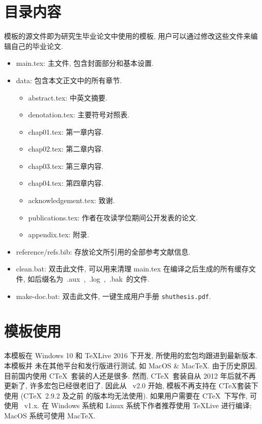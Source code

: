 \section{目录内容}
模板的源文件即为研究生毕业论文中使用的模板, 用户可以通过修改这些文件来编辑自己的毕业论文.
\begin{itemize}
    \item{main.tex}: 主文件, 包含封面部分和基本设置.
    \item{data}: 包含本文正文中的所有章节.
          \begin{itemize}
              \item{abstract.tex}: 中英文摘要.
              \item{denotation.tex}: 主要符号对照表.
              \item{chap01.tex}: 第一章内容.
              \item{chap02.tex}: 第二章内容.
              \item{chap03.tex}: 第三章内容.
              \item{chap04.tex}: 第四章内容.
              \item{acknowledgement.tex}: 致谢.
              \item{publications.tex}: 作者在攻读学位期间公开发表的论文.
              \item{appendix.tex}: 附录.
          \end{itemize}
    \item{reference/refs.bib}: 存放论文所引用的全部参考文献信息.
    \item{clean.bat}: 双击此文件, 可以用来清理 main.tex 在编译之后生成的所有缓存文件,
          如后缀名为~.aux~,~.log~,~.bak~的文件.
    \item{make-doc.bat}: 双击此文件, 一键生成用户手册 \texttt{shuthesis.pdf}.
\end{itemize}


\section{模板使用}
\label{sec:first}

本模板在 Windows 10 和 \TeX Live 2016 下开发, 所使用的宏包均跟进到最新版本. 本模板并
未在其他平台和发行版进行测试, 如 MacOS \& Mac\TeX. 由于历史原因, 目前国内使用 C\TeX\
套装的人还是很多. 然而, C\TeX\ 套装自从 2012 年后就不再更新了, 许多宏包已经很老旧了.
因此从 \shuthesis\ v2.0 开始, 模板不再支持在 C\TeX 套装下使用 (C\TeX\ 2.9.2 及之前
的版本均无法使用). 如果用户需要在 C\TeX\ 下写作, 可使用 \shuthesis\ v1.x. 在 Windows
系统和 Linux 系统下作者推荐使用 \TeX Live 进行编译; MacOS 系统可使用 Mac\TeX.











